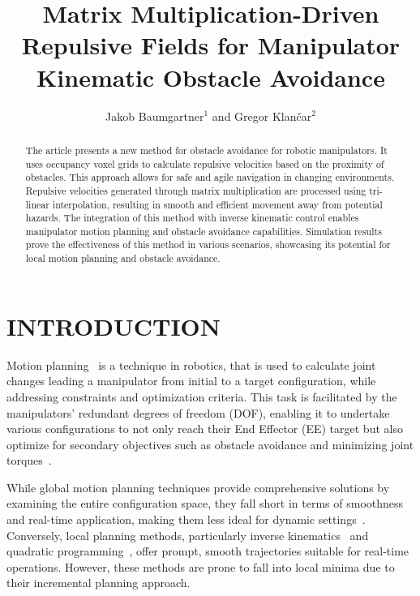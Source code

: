 \documentclass[letterpaper, 10 pt, conference]{ieeeconf}  %
\title{\LARGE \bf
Matrix Multiplication-Driven Repulsive Fields for Manipulator Kinematic Obstacle Avoidance
}
\author{
	Jakob Baumgartner$^{1}$ and Gregor Klančar$^{2}$%
}
\begin{document}
\maketitle
\thispagestyle{empty}
\pagestyle{empty}


\begin{abstract}

The article presents a new method for obstacle avoidance for robotic manipulators. It uses occupancy voxel grids to calculate repulsive velocities based on the proximity of obstacles. This approach allows for safe and agile navigation in changing environments. Repulsive velocities generated through matrix multiplication are processed using tri-linear interpolation, resulting in smooth and efficient movement away from potential hazards. The integration of this method with inverse kinematic control enables manipulator motion planning and obstacle avoidance capabilities. Simulation results prove the effectiveness of this method in various scenarios, showcasing its potential for local motion planning and obstacle avoidance.

\end{abstract}

\section{INTRODUCTION}

Motion planning~\cite{c52} is a technique in robotics, that is used to calculate joint changes leading a manipulator from initial to a target configuration, while addressing constraints and optimization criteria. This task is facilitated by the manipulators' redundant degrees of freedom (DOF), enabling it to undertake various configurations to not only reach their End Effector (EE) target but also optimize for secondary objectives such as obstacle avoidance and minimizing joint torques~\cite{c30}.

While global motion planning techniques provide comprehensive solutions by examining the entire configuration space, they fall short in terms of smoothness and real-time application, making them less ideal for dynamic settings~\cite{c52}. Conversely, local planning methods, particularly inverse kinematics~\cite{c38} and quadratic programming~\cite{c21,c23, haviland2021neo}, offer prompt, smooth trajectories suitable for real-time operations. However, these methods are prone to fall into local minima due to their incremental planning approach.
\end{document}
